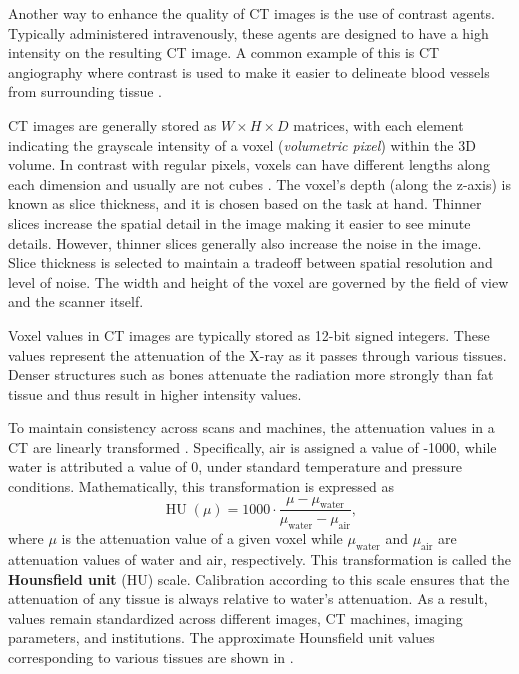 Another way to enhance the quality of CT images is the use of contrast agents. Typically administered intravenously, these agents are designed to have a high intensity on the resulting CT image. A common example of this is CT angiography where contrast is used to make it easier to delineate blood vessels from surrounding tissue \cite{goldmanPrinciplesCTCT2007}.

CT images are generally stored as $W \times H \times D$ matrices, with each element indicating the grayscale intensity of a voxel (\textit{volumetric pixel}) within the 3D volume. In contrast with regular pixels, voxels can have different lengths along each dimension and usually are not cubes \cite{mottolaReproducibilityCTbasedRadiomic2021}. The voxel's depth (along the z-axis) is known as slice thickness, and it is chosen based on the task at hand. Thinner slices increase the spatial detail in the image making it easier to see minute details. However, thinner slices generally also increase the noise in the image. Slice thickness is selected to maintain a tradeoff between spatial resolution and level of noise. The width and height of the voxel are governed by the field of view and the scanner itself.

Voxel values in CT images are typically stored as 12-bit signed integers. These values represent the attenuation of the X-ray as it passes through various tissues. Denser structures such as bones attenuate the radiation more strongly than fat tissue and thus result in higher intensity values.

To maintain consistency across scans and machines, the attenuation values in a CT are linearly transformed \cite{fosbinder2011essentials}. Specifically, air is assigned a value of -1000, while water is attributed a value of 0, under standard temperature and pressure conditions. Mathematically, this transformation is expressed as
\begin{equation}
	{\operatorname{HU}(\mu)}=1000 \cdot {\frac {\mu -\mu _{\textrm {water}}}{\mu _{\textrm {water}}-\mu _{\textrm {air}}}},
\end{equation}
where $\mu$ is the attenuation value of a given voxel while $\mu_{\textrm {water}}$ and $\mu_{\textrm {air}}$ are attenuation values of water and air, respectively. This transformation is called the \textbf{Hounsfield unit} (HU) scale. Calibration according to this scale ensures that the attenuation of any tissue is always relative to water's attenuation. As a result, values remain standardized across different images, CT machines, imaging parameters, and institutions. The approximate Hounsfield unit values corresponding to various tissues are shown in .

